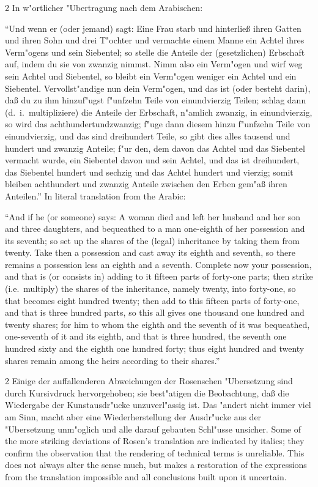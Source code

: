 \documentclass[10pt,a4paper]{article}
\renewcommand{\switchcolumn}{\syncronize\nointerlineskip\columnbreak}
\newcommand{\enquote}[1]{``#1''}
\begin{document}
\begin{paracol}{2}
In w"ortlicher "Ubertragung nach dem Arabischen:

\enquote{Und wenn er (oder jemand) sagt: Eine Frau starb und hinterlie\ss{} ihren Gatten und ihren Sohn und drei T"ochter und vermachte einem Manne ein Achtel ihres Verm"ogens und sein Siebentel; so stelle die Anteile der (gesetzlichen) Erbschaft auf, indem du sie von zwanzig nimmst. Nimm also ein Verm"ogen und wirf weg sein Achtel und Siebentel, so bleibt ein Verm"ogen weniger ein Achtel und ein Siebentel. Vervollst"andige nun dein Verm"ogen, und das ist (oder besteht darin), da\ss{} du zu ihm hinzuf"ugst f"unfzehn Teile von einundvierzig Teilen; schlag dann (d.\ i.\ multipliziere) die Anteile der Erbschaft, n"amlich zwanzig, in einundvierzig, so wird das achthundertundzwanzig; f"uge dann diesem hinzu f"unfzehn Teile von einundvierzig, und das sind dreihundert Teile, so gibt dies alles tausend und hundert und zwanzig Anteile; f"ur den, dem davon das Achtel und das Siebentel vermacht wurde, ein Siebentel davon und sein Achtel, und das ist dreihundert, das Siebentel hundert und sechzig und das Achtel hundert und vierzig; somit bleiben achthundert und zwanzig Anteile zwischen den Erben gem"a\ss{} ihren Anteilen.}
\switchcolumn
In literal translation from the Arabic:

``And if he (or someone) says: A woman died and left her husband and her son and three daughters, and bequeathed to a man one-eighth of her possession and its seventh; so set up the shares of the (legal) inheritance by taking them from twenty. Take then a possession and cast away its eighth and seventh, so there remains a possession less an eighth and a seventh. Complete now your possession, and that is (or consists in) adding to it fifteen parts of forty-one parts; then strike (i.e.\ multiply) the shares of the inheritance, namely twenty, into forty-one, so that becomes eight hundred twenty; then add to this fifteen parts of forty-one, and that is three hundred parts, so this all gives one thousand one hundred and twenty shares; for him to whom the eighth and the seventh of it was bequeathed, one-seventh of it and its eighth, and that is three hundred, the seventh one hundred sixty and the eighth one hundred forty; thus eight hundred and twenty shares remain among the heirs according to their shares.''
\end{paracol}

\begin{paracol}{2}
Einige der auffallenderen Abweichungen der Rosenschen "Ubersetzung sind durch Kursivdruck hervorgehoben; sie best"atigen die Beobachtung, da\ss{} die Wiedergabe der Kunstausdr"ucke unzuverl"assig ist. Das "andert nicht immer viel am Sinn, macht aber eine Wiederherstellung der Ausdr"ucke aus der "Ubersetzung unm"oglich und alle darauf gebauten Schl"usse unsicher.
\switchcolumn
Some of the more striking deviations of Rosen's translation are indicated by italics; they confirm the observation that the rendering of technical terms is unreliable. This does not always alter the sense much, but makes a restoration of the expressions from the translation impossible and all conclusions built upon it uncertain.
\end{paracol}
\end{document}
